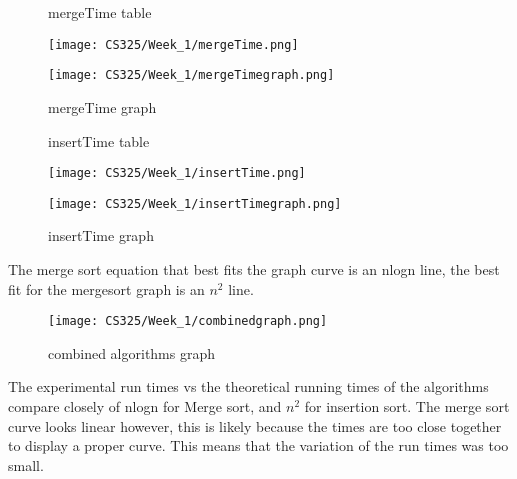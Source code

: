\documentclass{article}
\begin{document}
\begin{figure}
    \centering
    \caption{mergeTime table}
    \texttt{[image: CS325/Week\_1/mergeTime.png]}
    \caption{mergeTime graph}
    \texttt{[image: CS325/Week\_1/mergeTimegraph.png]}
\end{figure}

\begin{figure}
    \centering
    \caption{insertTime table}
    \texttt{[image: CS325/Week\_1/insertTime.png]}
    \caption{insertTime graph}
    \texttt{[image: CS325/Week\_1/insertTimegraph.png]}
\end{figure}
\newpage

The merge sort equation that best fits the graph curve is an nlogn line, the best fit for the mergesort graph is an $n^2$ line.

\begin{figure}
    \centering
    \caption{combined algorithms graph}
    \texttt{[image: CS325/Week\_1/combinedgraph.png]}
\end{figure}
    
The experimental run times vs the theoretical running times of the algorithms compare closely of nlogn for Merge sort, and $n^2$ for insertion sort. The merge sort curve looks linear however, this is likely because the times are too close together to display a proper curve. This means that the variation of the run times was too small.  
\end{document}
